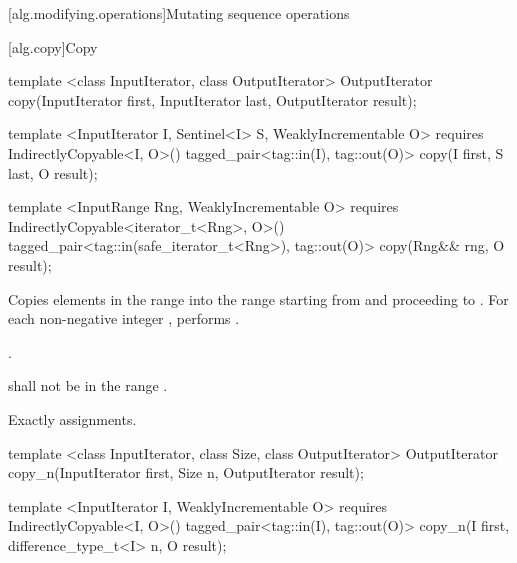 [alg.modifying.operations]{Mutating sequence operations}

[alg.copy]{Copy}

%
\begin{removedblock}
\begin{itemdecl}
template <class InputIterator, class OutputIterator>
  OutputIterator copy(InputIterator first, InputIterator last,
                      OutputIterator result);
\end{itemdecl}
\end{removedblock}
\begin{addedblock}
\begin{itemdecl}
template <InputIterator I, Sentinel<I> S, WeaklyIncrementable O>
  requires IndirectlyCopyable<I, O>()
  tagged_pair<tag::in(I), tag::out(O)>
    copy(I first, S last, O result);

template <InputRange Rng, WeaklyIncrementable O>
  requires IndirectlyCopyable<iterator_t<Rng>, O>()
  tagged_pair<tag::in(safe_iterator_t<Rng>), tag::out(O)>
    copy(Rng&& rng, O result);
\end{itemdecl}
\end{addedblock}

\begin{itemdescr}
\pnum
\effects Copies elements in the range  into the range
 starting from  and
proceeding to . For each non-negative integer
, performs .

\pnum
\returns {}.

\pnum
\requires {} shall not be in the range .

\pnum
\complexity Exactly  assignments.
\end{itemdescr}

%
\begin{removedblock}
\begin{itemdecl}
template <class InputIterator, class Size, class OutputIterator>
  OutputIterator copy_n(InputIterator first, Size n,
                        OutputIterator result);
\end{itemdecl}
\end{removedblock}
\begin{addedblock}
\begin{itemdecl}
template <InputIterator I, WeaklyIncrementable O>
  requires IndirectlyCopyable<I, O>()
  tagged_pair<tag::in(I), tag::out(O)>
    copy_n(I first, difference_type_t<I> n, O result);
\end{itemdecl}
\end{addedblock}

